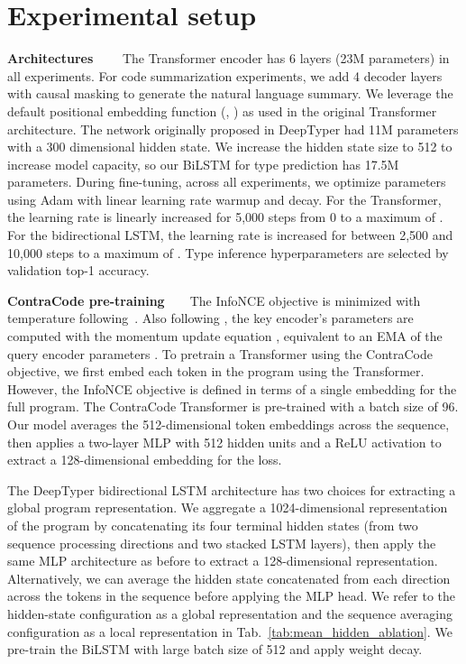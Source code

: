 \documentclass[11pt]{article}
\newcommand{\ours}[0]{ContraCode}
\begin{document}
\section{Experimental setup}
\textbf{Architectures}~~~~
The Transformer encoder has 6 layers (23M parameters) in all experiments. For code summarization experiments, we add 4 decoder layers with causal masking to generate the natural language summary.
We leverage the default positional embedding function (, ) as used in the original Transformer architecture. The network originally proposed in DeepTyper \citep{hellendoorn2018deep} had 11M parameters with a 300 dimensional hidden state. We increase the hidden state size to 512 to increase model capacity, so our BiLSTM for type prediction has 17.5M parameters.
During fine-tuning, across all experiments, we optimize parameters using Adam with linear learning rate warmup and decay. For the Transformer, the learning rate is linearly increased for 5,000 steps from 0 to a maximum of . For the bidirectional LSTM, the learning rate is increased for between 2,500 and 10,000 steps to a maximum of . Type inference hyperparameters are selected by validation top-1 accuracy.

\textbf{\ours{} pre-training}~~~~The InfoNCE objective is minimized with temperature  following~\citet{he2019momentum}. Also following \citet{he2019momentum}, the key encoder's parameters are computed with the momentum update equation , equivalent to an EMA of the query encoder parameters . To pretrain a Transformer using the \ours{} objective, we first embed each token in the program using the Transformer. However, the InfoNCE objective is defined in terms of a single embedding for the full program. The \ours{} Transformer is pre-trained with a batch size of 96. Our model averages the 512-dimensional token embeddings across the sequence, then applies a two-layer MLP with 512 hidden units and a ReLU activation to extract a 128-dimensional embedding for the loss.

The DeepTyper bidirectional LSTM architecture has two choices for extracting a global program representation. We aggregate a 1024-dimensional representation of the program by concatenating its four terminal hidden states (from two sequence processing directions and two stacked LSTM layers), then apply the same MLP architecture as before to extract a 128-dimensional representation. Alternatively, we can average the hidden state concatenated from each direction across the tokens in the sequence before applying the MLP head. We refer to the hidden-state configuration as a global representation and the sequence averaging configuration as a local representation in Tab.~\ref{tab:mean_hidden_ablation}. We pre-train the BiLSTM with large batch size of 512 and apply weight decay.
\end{document}
